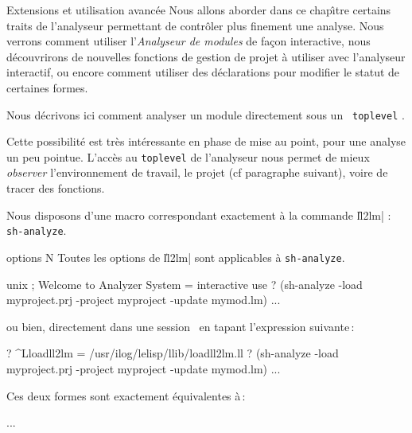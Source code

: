  {Extensions et utilisation avanc\'{e}e}
Nous allons aborder dans ce chap\^{\i}tre certains traits de l'analyseur
permettant de contr\^{o}ler plus finement une analyse. 
Nous verrons 
comment utiliser l'{\it Analyseur de modules} de fa\c{c}on interactive, 
nous d\'{e}couvrirons de nouvelles fonctions de gestion de projet \`{a}
utiliser avec l'analyseur interactif, 
ou encore 
comment utiliser des d\'{e}clarations pour modifier le statut de
certaines formes.

Nous d\'{e}crivons ici comment analyser un module directement sous un {\tt
toplevel} \LeLisp . 

Cette possibilit\'{e} est tr\`{e}s int\'{e}ressante en phase de mise au point, pour une
analyse un peu pointue. L'acc\`{e}s au {\tt toplevel} de l'analyseur nous
permet de mieux {\it observer} l'environnement de travail, le projet
(cf paragraphe suivant), voire de tracer des fonctions.

Nous disposons d'une macro correspondant
exactement \`{a} la commande \|ll2lm| : {\tt sh-analyze}. 

 {options} {N}
Toutes les options de \|ll2lm| sont applicables \`{a} {\tt sh-analyze}.

\begin{Code*}
unix%
; Welcome to Analyzer System
= interactive use
? (sh-analyze -load myproject.prj -project myproject -update mymod.lm)
 ...
\end{Code*}

ou bien, directement dans une session \LeLisp\, en tapant l'expression
suivante\,: 
\begin{Code*}
? ^Lloadll2lm
= /usr/ilog/lelisp/llib/loadll2lm.ll
? (sh-analyze -load myproject.prj -project myproject -update mymod.lm)
 ...
\end{Code*}

Ces deux formes sont exactement \'{e}quivalentes \`{a}\,:
\begin{Code*}
 ...
\end{Code*}


